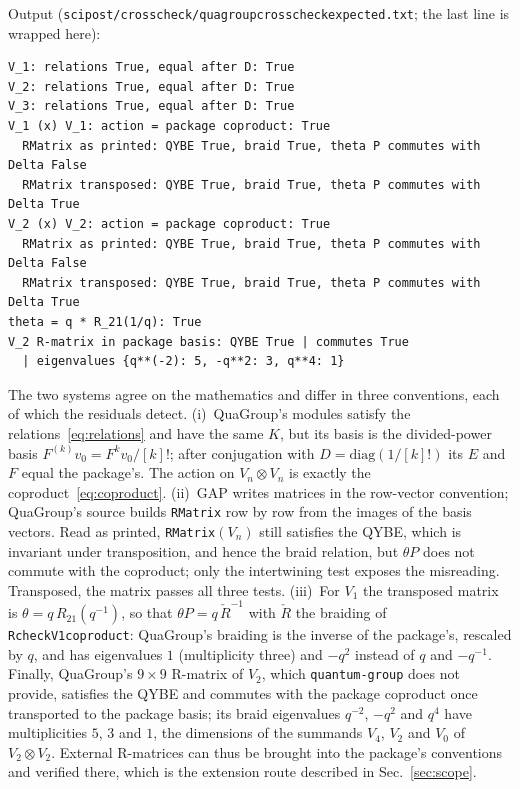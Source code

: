 \documentclass{SciPost}
\newcommand{\pkg}{\texttt{quantum-group}}
\newcommand{\code}[1]{\texttt{\begingroup\def\_{\textunderscore\allowbreak}#1\endgroup}}
\begin{document}
Output (\code{scipost/\allowbreak crosscheck/\allowbreak quagroup\_crosscheck\_expected.txt}; the last line is wrapped here):
\begin{lstlisting}[style=output]
V_1: relations True, equal after D: True
V_2: relations True, equal after D: True
V_3: relations True, equal after D: True
V_1 (x) V_1: action = package coproduct: True
  RMatrix as printed: QYBE True, braid True, theta P commutes with Delta False
  RMatrix transposed: QYBE True, braid True, theta P commutes with Delta True
V_2 (x) V_2: action = package coproduct: True
  RMatrix as printed: QYBE True, braid True, theta P commutes with Delta False
  RMatrix transposed: QYBE True, braid True, theta P commutes with Delta True
theta = q * R_21(1/q): True
V_2 R-matrix in package basis: QYBE True | commutes True
  | eigenvalues {q**(-2): 5, -q**2: 3, q**4: 1}
\end{lstlisting}
The two systems agree on the mathematics and differ in three conventions, each of which the residuals detect. (i)~QuaGroup's modules satisfy the relations~\eqref{eq:relations} and have the same $K$, but its basis is the divided-power basis $F^{(k)}v_0=F^kv_0/[k]!$; after conjugation with $D=\mathrm{diag}(1/[k]!)$ its $E$ and $F$ equal the package's. The action on $V_n\otimes V_n$ is exactly the coproduct~\eqref{eq:coproduct}. (ii)~GAP writes matrices in the row-vector convention; QuaGroup's source builds \code{RMatrix} row by row from the images of the basis vectors. Read as printed, \code{RMatrix}$(V_n)$ still satisfies the QYBE, which is invariant under transposition, and hence the braid relation, but $\theta P$ does not commute with the coproduct; only the intertwining test exposes the misreading. Transposed, the matrix passes all three tests. (iii)~For $V_1$ the transposed matrix is $\theta=q\,R_{21}(q^{-1})$, so that $\theta P=q\,\check R^{-1}$ with $\check R$ the braiding of \code{R\_check\_V1\_coproduct}: QuaGroup's braiding is the inverse of the package's, rescaled by $q$, and has eigenvalues $1$ (multiplicity three) and $-q^2$ instead of $q$ and $-q^{-1}$. Finally, QuaGroup's $9\times9$ R-matrix of $V_2$, which \pkg{} does not provide, satisfies the QYBE and commutes with the package coproduct once transported to the package basis; its braid eigenvalues $q^{-2}$, $-q^2$ and $q^4$ have multiplicities $5$, $3$ and $1$, the dimensions of the summands $V_4$, $V_2$ and $V_0$ of $V_2\otimes V_2$. External R-matrices can thus be brought into the package's conventions and verified there, which is the extension route described in Sec.~\ref{sec:scope}.
\end{document}
